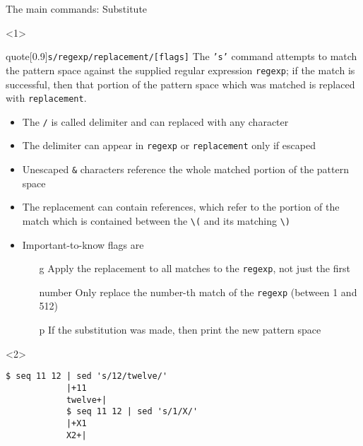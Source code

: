 \begin{frame}[fragile]{The main commands: Substitute}
    \vspace{-2mm}
    \begin{onlyenv}<1>
        \begin{varblock}{quote}[0.9\textwidth]{\texttt{s/regexp/replacement/[flags]}}
            \textnormal{The \texttt{'s'} command attempts to match the pattern space against the supplied regular expression \texttt{regexp};
            if the match is successful, then that portion of the pattern space which was matched is replaced with \texttt{replacement}.}
        \end{varblock}
        \begin{itemize}
            \item The \texttt{/} is called delimiter and can replaced with any character
            \item The delimiter can appear in \texttt{regexp} or \texttt{replacement} only if escaped
            \item Unescaped \alert{\texttt{\&}} characters reference \alert{the whole matched portion of the pattern space}
            \item The replacement can contain  references,
                  which refer to the portion of the match which is contained between the  \texttt{\textbackslash(} and its matching \texttt{\textbackslash)}
            \item Important-to-know flags are
                  \begin{itemize}
                      \item[g] Apply the replacement to all matches to the \texttt{regexp}, not just the first
                      \item[number] Only replace the number-th match of the \texttt{regexp} (between 1 and 512)
                      \item[p] If the substitution was made, then print the new pattern space
                  \end{itemize}
        \end{itemize}
    \end{onlyenv}
    \begin{onlyenv}<2>
        \begin{lstlisting}[style=MyBash]
            $ seq 11 12 | sed 's/12/twelve/'
            |+11
            twelve+|
            $ seq 11 12 | sed 's/1/X/'
            |+X1
            X2+|

\end{lstlisting}
\end{onlyenv}
\end{frame}
